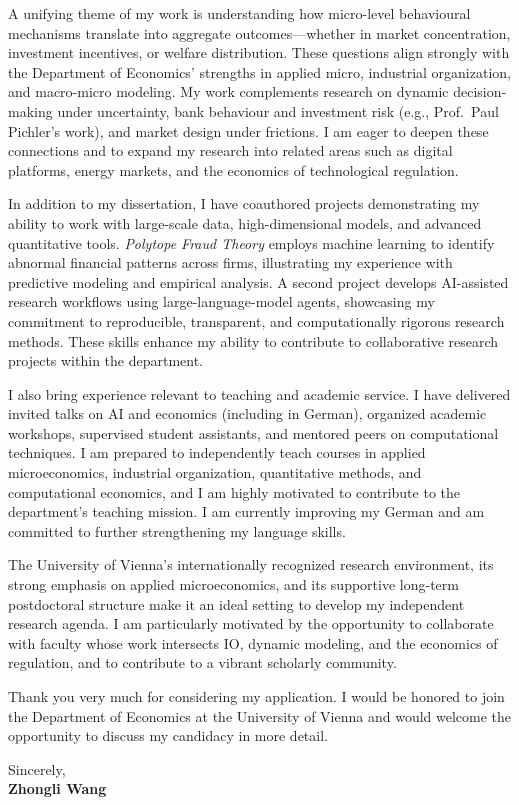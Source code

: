\documentclass[11pt]{article}
\begin{document}
A unifying theme of my work is understanding how micro-level behavioural mechanisms translate into aggregate outcomes—whether in market concentration, investment incentives, or welfare distribution. These questions align strongly with the Department of Economics’ strengths in applied micro, industrial organization, and macro-micro modeling. My work complements research on dynamic decision-making under uncertainty, bank behaviour and investment risk (e.g., Prof.\ Paul Pichler’s work), and market design under frictions. I am eager to deepen these connections and to expand my research into related areas such as digital platforms, energy markets, and the economics of technological regulation.

In addition to my dissertation, I have coauthored projects demonstrating my ability to work with large-scale data, high-dimensional models, and advanced quantitative tools. \textit{Polytope Fraud Theory} employs machine learning to identify abnormal financial patterns across firms, illustrating my experience with predictive modeling and empirical analysis. A second project develops AI-assisted research workflows using large-language-model agents, showcasing my commitment to reproducible, transparent, and computationally rigorous research methods. These skills enhance my ability to contribute to collaborative research projects within the department.

I also bring experience relevant to teaching and academic service. I have delivered invited talks on AI and economics (including in German), organized academic workshops, supervised student assistants, and mentored peers on computational techniques. I am prepared to independently teach courses in applied microeconomics, industrial organization, quantitative methods, and computational economics, and I am highly motivated to contribute to the department’s teaching mission. I am currently improving my German and am committed to further strengthening my language skills.

The University of Vienna’s internationally recognized research environment, its strong emphasis on applied microeconomics, and its supportive long-term postdoctoral structure make it an ideal setting to develop my independent research agenda. 
I am particularly motivated by the opportunity to collaborate with faculty whose work intersects IO, dynamic modeling, and the economics of regulation, and to contribute to a vibrant scholarly community.

Thank you very much for considering my application. I would be honored to join the Department of Economics at the University of Vienna and would welcome the opportunity to discuss my candidacy in more detail.

\vspace{6mm}

\noindent Sincerely,\\[12mm]
\noindent \textbf{Zhongli Wang}
\end{document}
